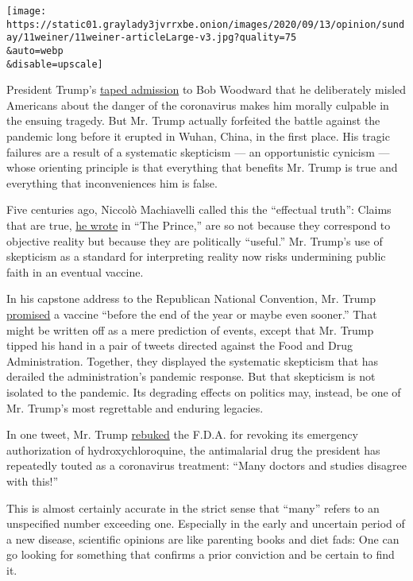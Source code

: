 \texttt{[image: https://static01.graylady3jvrrxbe.onion/images/2020/09/13/opinion/sunday/11weiner/11weiner-articleLarge-v3.jpg?quality=75\\\&auto=webp\\\&disable=upscale]}

President Trump's
\href{https://www.nytimes3xbfgragh.onion/2020/09/09/us/politics/woodward-trump-book-virus.html}{taped
admission} to Bob Woodward that he deliberately misled Americans about
the danger of the coronavirus makes him morally culpable in the ensuing
tragedy. But Mr. Trump actually forfeited the battle against the
pandemic long before it erupted in Wuhan, China, in the first place. His
tragic failures are a result of a systematic skepticism --- an
opportunistic cynicism --- whose orienting principle is that everything
that benefits Mr. Trump is true and everything that inconveniences him
is false.

Five centuries ago, Niccolò Machiavelli called this the ``effectual
truth'': Claims that are true,
\href{https://www.google.com/books/edition/The_Prince/ehzOd8DVlNkC?hl=en\&gbpv=1\&dq=mansfield+the+prince\&printsec=frontcover}{he
wrote} in ``The Prince,'' are so not because they correspond to
objective reality but because they are politically ``useful.'' Mr.
Trump's use of skepticism as a standard for interpreting reality now
risks undermining public faith in an eventual vaccine.

In his capstone address to the Republican National Convention, Mr. Trump
\href{https://www.nytimes3xbfgragh.onion/live/2020/08/27/us/rnc-fact-check}{promised}
a vaccine ``before the end of the year or maybe even sooner.'' That
might be written off as a mere prediction of events, except that Mr.
Trump tipped his hand in a pair of tweets directed against the Food and
Drug Administration. Together, they displayed the systematic skepticism
that has derailed the administration's pandemic response. But that
skepticism is not isolated to the pandemic. Its degrading effects on
politics may, instead, be one of Mr. Trump's most regrettable and
enduring legacies.

In one tweet, Mr. Trump
\href{https://twitter.com/realdonaldtrump/status/1297148038385991680?s=11}{rebuked}
the F.D.A. for revoking its emergency authorization of
hydroxychloroquine, the antimalarial drug the president has repeatedly
touted as a coronavirus treatment: ``Many doctors and studies disagree
with this!''

This is almost certainly accurate in the strict sense that ``many''
refers to an unspecified number exceeding one. Especially in the early
and uncertain period of a new disease, scientific opinions are like
parenting books and diet fads: One can go looking for something that
confirms a prior conviction and be certain to find it.

